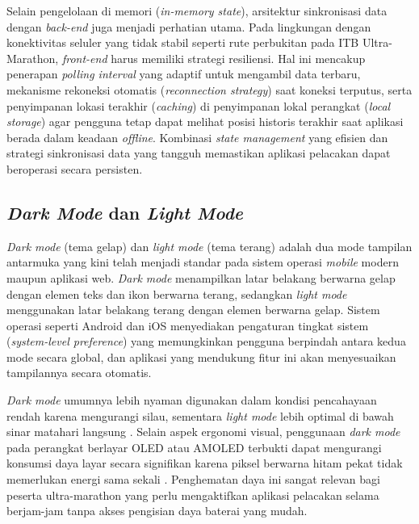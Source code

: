 Selain pengelolaan di memori (\textit{in-memory state}), arsitektur sinkronisasi data dengan \textit{back-end} juga menjadi perhatian utama. Pada lingkungan dengan konektivitas seluler yang tidak stabil seperti rute perbukitan pada ITB Ultra-Marathon, \textit{front-end} harus memiliki strategi resiliensi. Hal ini mencakup penerapan \textit{polling interval} yang adaptif untuk mengambil data terbaru, mekanisme rekoneksi otomatis (\textit{reconnection strategy}) saat koneksi terputus, serta penyimpanan lokasi terakhir (\textit{caching}) di penyimpanan lokal perangkat (\textit{local storage}) agar pengguna tetap dapat melihat posisi historis terakhir saat aplikasi berada dalam keadaan \textit{offline}. Kombinasi \textit{state management} yang efisien dan strategi sinkronisasi data yang tangguh memastikan aplikasi pelacakan dapat beroperasi secara persisten.

\subsection{\textit{Dark Mode} dan \textit{Light Mode}}
\label{subsec:dark-light-mode}

\textit{Dark mode} (tema gelap) dan \textit{light mode} (tema terang) adalah dua mode tampilan antarmuka yang kini telah menjadi standar pada sistem operasi \textit{mobile} modern maupun aplikasi web. \textit{Dark mode} menampilkan latar belakang berwarna gelap dengan elemen teks dan ikon berwarna terang, sedangkan \textit{light mode} menggunakan latar belakang terang dengan elemen berwarna gelap. Sistem operasi seperti Android dan iOS menyediakan pengaturan tingkat sistem (\textit{system-level preference}) yang memungkinkan pengguna berpindah antara kedua mode secara global, dan aplikasi yang mendukung fitur ini akan menyesuaikan tampilannya secara otomatis.

\textit{Dark mode} umumnya lebih nyaman digunakan dalam kondisi pencahayaan rendah karena mengurangi silau, sementara \textit{light mode} lebih optimal di bawah sinar matahari langsung \cite{shieh2000effects}. Selain aspek ergonomi visual, penggunaan \textit{dark mode} pada perangkat berlayar OLED atau AMOLED terbukti dapat mengurangi konsumsi daya layar secara signifikan karena piksel berwarna hitam pekat tidak memerlukan energi sama sekali \cite{dong2009power, zhang2021dark}. Penghematan daya ini sangat relevan bagi peserta ultra-marathon yang perlu mengaktifkan aplikasi pelacakan selama berjam-jam tanpa akses pengisian daya baterai yang mudah.

